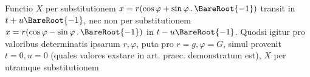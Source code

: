Functio $X$ per substitutionem $x=r(\cos\varphi+\sin\varphi\, .\,\BareRoot{-1})$ transit in $t+u\BareRoot{-1}$,
nec non per substitutionem $x=r(\cos\varphi-\sin\varphi\, .\,\BareRoot{-1})$ in $t-u\BareRoot{-1}$. Quodsi
igitur pro valoribus determinatis ipsarum $r,\varphi$, puta pro $r=g,\varphi=G$, simul
provenit $t=0,u=0$ (quales valores exstare in art. praec. demonstratum est),
$X$ per utramque substitutionem
